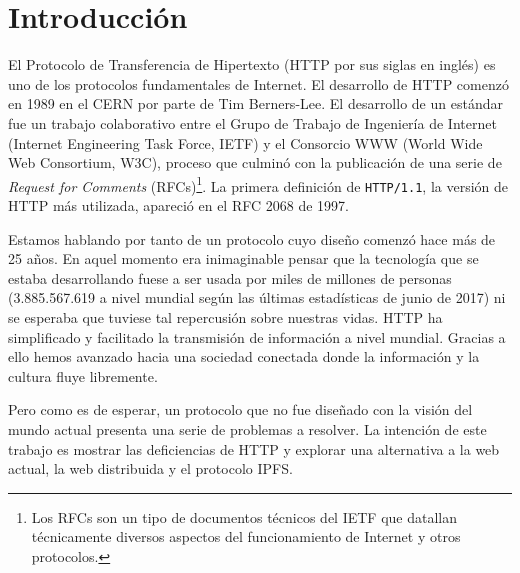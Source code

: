 \documentclass[12pt]{article} %
\begin{document}

\tableofcontents %

\newpage %


\section*{Introducción}

El Protocolo de Transferencia de Hipertexto (HTTP por sus siglas en inglés) es uno de los protocolos fundamentales de Internet. El desarrollo de HTTP comenzó en 1989 en el CERN por parte de Tim Berners-Lee. El desarrollo de un estándar fue un trabajo colaborativo entre el Grupo de Trabajo de Ingeniería de Internet (Internet Engineering Task Force, IETF) y el Consorcio WWW (World Wide Web Consortium, W3C), proceso que culminó con la publicación de una serie de \textit{Request for Comments} (RFCs)\footnote{Los RFCs son un tipo de documentos técnicos del IETF que datallan técnicamente diversos aspectos del funcionamiento de Internet y otros protocolos.}. La primera definición de \texttt{HTTP/1.1}, la versión de HTTP más utilizada, apareció en el RFC 2068 de 1997. 

Estamos hablando por tanto de un protocolo cuyo diseño comenzó hace más de 25 años. En aquel momento era inimaginable pensar que la tecnología que se estaba desarrollando fuese a ser usada por miles de millones de personas (3.885.567.619 a nivel mundial según las últimas estadísticas\cite{internet-world-stats} de junio de 2017) ni se esperaba que tuviese tal repercusión sobre nuestras vidas. HTTP ha simplificado y facilitado la transmisión de información a nivel mundial. Gracias a ello hemos avanzado hacia una sociedad conectada donde la información y la cultura fluye libremente.

Pero como es de esperar, un protocolo que no fue diseñado con la visión del mundo actual presenta una serie de problemas a resolver. La intención de este trabajo es mostrar las deficiencias de HTTP y explorar una alternativa a la web actual, la web distribuida y el protocolo IPFS.
\end{document}
